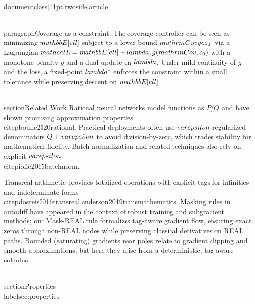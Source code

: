 \\documentclass[11pt,twoside]{article}
\begin{document}
\\paragraph{Coverage as a constraint.} The coverage controller can be seen as minimizing $\\mathbb{E}[\\ell]$ subject to a lower‑bound $\\mathrm{Cov}\\ge c_0$, via a Lagrangian $\\mathcal{L}=\\mathbb{E}[\\ell] + \\lambda\\,g(\\mathrm{Cov},c_0)$ with a monotone penalty $g$ and a dual update on $\\lambda$. Under mild continuity of $g$ and the loss, a fixed‑point $\\lambda^*$ enforces the constraint within a small tolerance while preserving descent on $\\mathbb{E}[\\ell]$.

\\section{Related Work}
Rational neural networks model functions as $P/Q$ and have shown promising approximation properties \\citep{boulle2020rational}. Practical deployments often use $\\varepsilon$-regularized denominators $Q+\\varepsilon$ to avoid division-by-zero, which trades stability for mathematical fidelity. Batch normalization and related techniques also rely on explicit $\\varepsilon$ \\citep{ioffe2015batchnorm}.

Transreal arithmetic provides totalized operations with explicit tags for infinities and indeterminate forms \\citep{dosreis2016transreal,anderson2019transmathematics}. Masking rules in autodiff have appeared in the context of robust training and subgradient methods; our Mask-REAL rule formalizes tag-aware gradient flow, ensuring exact zeros through non-REAL nodes while preserving classical derivatives on REAL paths. Bounded (saturating) gradients near poles relate to gradient clipping and smooth approximations, but here they arise from a deterministic, tag-aware calculus.

\\section{Properties}
\\label{sec:properties}
\end{document}
